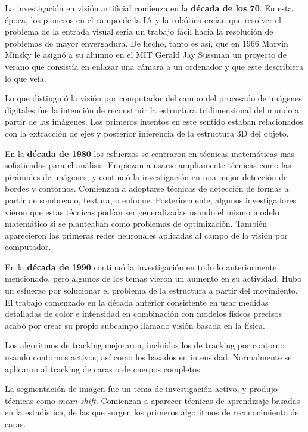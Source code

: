La investigación en visión artificial comienza en la \textbf{década de los 70}. En esta época, los pioneros en el campo de la IA y la robótica creían que resolver el problema de la entrada visual sería un trabajo fácil hacia la resolución de problemas de mayor envergadura. De hecho, tanto es así, que en 1966 Marvin Minsky le asignó a su alumno en el MIT Gerald Jay Sussman un proyecto de verano que consistía en enlazar una cámara a un ordenador y que este describiera lo que veía.

Lo que distinguió la visión por computador del campo del procesado de imágenes digitales fue la intención de reconstruir la estructura tridimensional del mundo a partir de las imágenes. Los primeros intentos en este sentido estaban relacionados con la extracción de ejes y posterior inferencia de la estructura 3D del objeto.

En la \textbf{década de 1980} los esfuerzos se centraron en técnicas matemáticas mas sofisticadas para el análisis. Empiezan a usarse ampliamente técnicas como las pirámides de imágenes, y continuó la investigación en una mejor detección de bordes y contornos. Comienzan a adoptarse técnicas de detección de formas a partir de sombreado, textura, o enfoque. Posteriormente, algunos investigadores vieron que estas técnicas podían ser generalizadas usando el mismo modelo matemático si se planteaban como problemas de optimización. También aparecieron las primeras redes neuronales aplicadas al campo de la visión por computador.

En la \textbf{década de 1990} continuó la investigación en todo lo anteriormente mencionado, pero algunos de los temas vieron un aumento en su actividad. Hubo un esfuerzo por solucionar el problema de la estructura a partir del movimiento. El trabajo comenzado en la década anterior consistente en usar medidas detalladas de color e intensidad en combinación con modelos físicos precisos acabó por crear su propio subcampo llamado visión basada en la física.

Los algoritmos de tracking mejoraron, incluidos los de tracking por contorno usando contornos activos, así como los basados en intensidad. Normalmente se aplicaron al tracking de caras o de cuerpos completos.

La segmentación de imagen fue un tema de investigación activo, y produjo técnicas como \textit{mean shift}. Comienzan a aparecer técnicas de aprendizaje basadas en la estadística, de las que surgen los primeros algoritmos de reconocimiento de caras.

